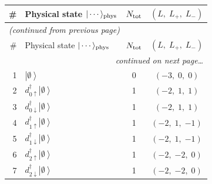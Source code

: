 \documentclass[11pt,a4paper]{article}
\newcommand{\ua}{\uparrow}
\newcommand{\da}{\downarrow}
\newcommand{\ket}[1]{\left|#1\right\rangle}
\newcommand{\empt}{\ket{\emptyset}}
\newcommand{\ddag}{d^{\dagger}}
\begin{document}
{\small
\begin{longtable}{rp{8.6cm}cc}
\toprule
\# & Physical state $|\cdots\rangle_{\rm phys}$
   & $N_{\rm tot}$
   & $(L,\;L_+,\;L_-)$ \\
\midrule
\endfirsthead
\multicolumn{4}{l}{\small\emph{(continued from previous page)}} \\[2pt]
\toprule
\# & Physical state $|\cdots\rangle_{\rm phys}$
   & $N_{\rm tot}$
   & $(L,\;L_+,\;L_-)$ \\
\midrule
\endhead
\midrule
\multicolumn{4}{r}{\small\emph{continued on next page\ldots}} \\
\endfoot
\bottomrule
\endlastfoot

\rowcolor{gray!10}
1 & $\empt$ & 0 & $(-3,\;0,\;0)$ \\[3pt]
\midrule

2 & $\ddag_{0\ua}\empt$
  & 1 & $(-2,\;1,\;1)$ \\
3 & $\ddag_{0\da}\empt$
  & 1 & $(-2,\;1,\;1)$ \\
4 & $\ddag_{1\ua}\empt$
  & 1 & $(-2,\;1,\;{-1})$ \\
5 & $\ddag_{1\da}\empt$
  & 1 & $(-2,\;1,\;{-1})$ \\
6 & $\ddag_{2\ua}\empt$
  & 1 & $(-2,\;{-2},\;0)$ \\
7 & $\ddag_{2\da}\empt$
  & 1 & $(-2,\;{-2},\;0)$ \\[3pt]
\midrule


\end{longtable}}
\end{document}
